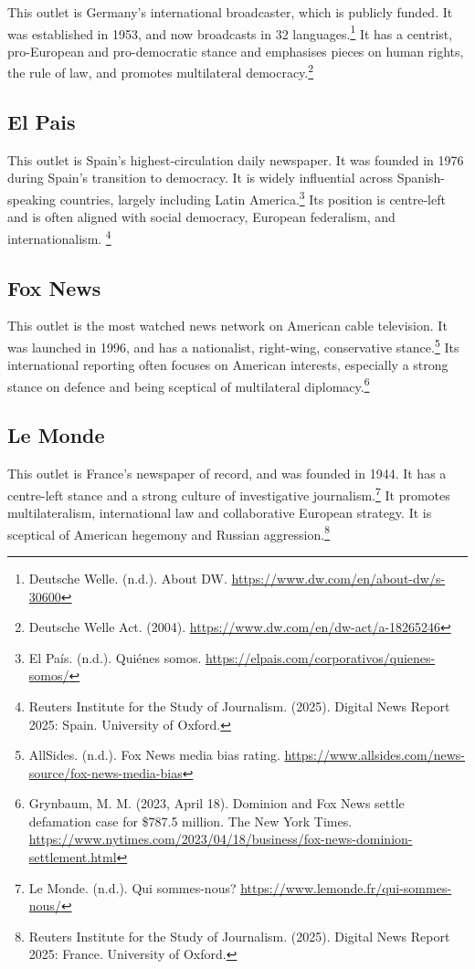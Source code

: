 This outlet is Germany’s international broadcaster, which is publicly funded. It was established in 1953, and now broadcasts in 32 languages.\footnote{Deutsche Welle. (n.d.). About DW. \url{https://www.dw.com/en/about-dw/s-30600}} It has a centrist, pro-European and pro-democratic stance and emphasises pieces on human rights, the rule of law, and promotes multilateral democracy.\footnote{Deutsche Welle Act. (2004). \url{https://www.dw.com/en/dw-act/a-18265246}}

\subsection{El Pais}

This outlet is Spain’s highest-circulation daily newspaper. It was founded in 1976 during Spain’s transition to democracy. It is widely influential across Spanish-speaking countries, largely including Latin America.\footnote{El País. (n.d.). Quiénes somos. \url{https://elpais.com/corporativos/quienes-somos/}} Its position is centre-left and is often aligned with social democracy, European federalism, and internationalism. \footnote{Reuters Institute for the Study of Journalism. (2025). Digital News Report 2025: Spain. University of Oxford.}

\subsection{Fox News}

This outlet is the most watched news network on American cable television. It was launched in 1996, and has a nationalist, right-wing, conservative stance.\footnote{AllSides. (n.d.). Fox News media bias rating. \url{https://www.allsides.com/news-source/fox-news-media-bias}} Its international reporting often focuses on American interests, especially a strong stance on defence and being sceptical of multilateral diplomacy.\footnote{Grynbaum, M. M. (2023, April 18). Dominion and Fox News settle defamation case for \$787.5 million. The New York Times. \url{https://www.nytimes.com/2023/04/18/business/fox-news-dominion-settlement.html}}

\subsection{Le Monde}

This outlet is France’s newspaper of record, and was founded in 1944. It has a centre-left stance and a strong culture of investigative journalism.\footnote{Le Monde. (n.d.). Qui sommes-nous? \url{https://www.lemonde.fr/qui-sommes-nous/}} It promotes multilateralism, international law and collaborative European strategy. It is sceptical of American hegemony and Russian aggression.\footnote{Reuters Institute for the Study of Journalism. (2025). Digital News Report 2025: France. University of Oxford.}

